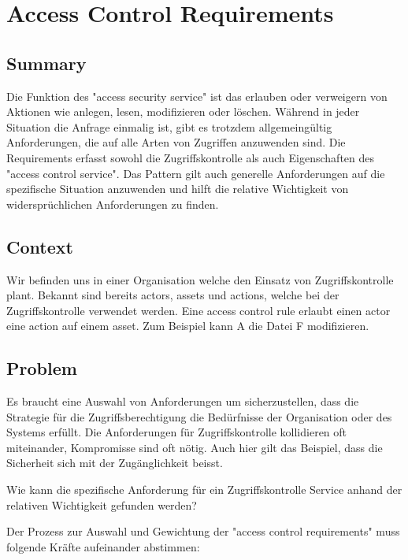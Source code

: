 \chapter{Access Control Requirements}

\section{Summary}
Die Funktion des "access security service" ist das erlauben oder verweigern von Aktionen wie anlegen, lesen, modifizieren oder löschen. Während in jeder Situation die Anfrage einmalig ist, gibt es trotzdem allgemeingültig Anforderungen, die auf alle Arten von Zugriffen anzuwenden sind. Die Requirements erfasst sowohl die Zugriffskontrolle als auch Eigenschaften des "access control service". Das Pattern gilt auch generelle Anforderungen auf die spezifische Situation anzuwenden und hilft die relative Wichtigkeit von widersprüchlichen Anforderungen zu finden.

\section{Context}
Wir befinden uns in einer Organisation welche den Einsatz von Zugriffskontrolle plant. Bekannt sind bereits actors, assets und actions, welche bei der Zugriffskontrolle verwendet werden. Eine access control rule erlaubt einen actor eine action auf einem asset. Zum Beispiel kann A die Datei F modifizieren.

\section{Problem}
Es braucht eine Auswahl von Anforderungen um sicherzustellen, dass die Strategie für die Zugriffsberechtigung die Bedürfnisse der Organisation oder des Systems erfüllt. Die Anforderungen für Zugriffskontrolle kollidieren oft miteinander, Kompromisse sind oft nötig. Auch hier gilt das Beispiel, dass die Sicherheit sich mit der Zugänglichkeit beisst.

Wie kann die spezifische Anforderung für ein Zugriffskontrolle Service anhand der relativen Wichtigkeit gefunden werden?

Der Prozess zur Auswahl und Gewichtung der "access control requirements" muss folgende Kräfte aufeinander abstimmen:

